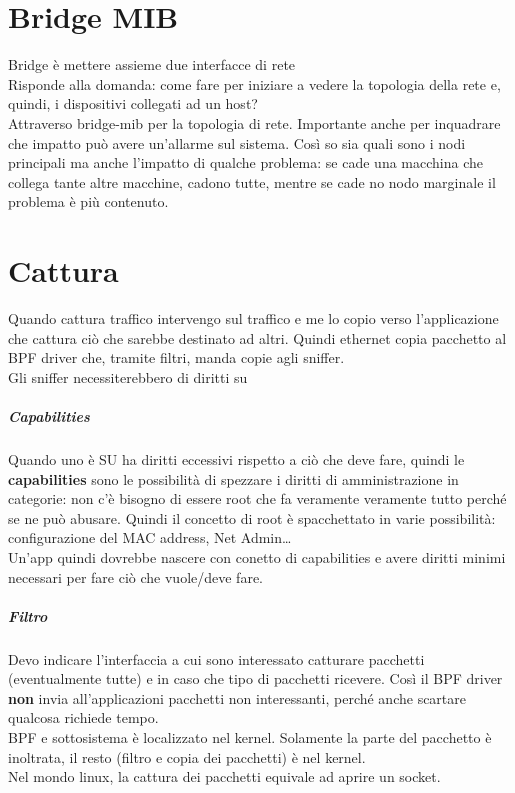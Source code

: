 \documentclass[10pt]{book}
\begin{document}
\chapter{Bridge MIB}
Bridge è mettere assieme due interfacce di rete\\
Risponde alla domanda: come fare per iniziare a vedere la topologia della rete e, quindi, i dispositivi collegati ad un host?\\
Attraverso bridge-mib per la topologia di rete. Importante anche per inquadrare che impatto può avere un'allarme sul sistema. Così so sia quali sono i nodi principali ma anche l'impatto di qualche problema: se cade una macchina che collega tante altre macchine, cadono tutte, mentre se cade no nodo marginale il problema è più contenuto.
\chapter{Cattura}
Quando cattura traffico intervengo sul traffico e me lo copio verso l'applicazione che cattura ciò che sarebbe destinato ad altri. Quindi ethernet copia pacchetto al BPF driver che, tramite filtri, manda copie agli sniffer.\\
Gli sniffer necessiterebbero di diritti su
\paragraph{Capabilities} Quando uno è SU ha diritti eccessivi rispetto a ciò che deve fare, quindi le \textbf{capabilities} sono le possibilità di spezzare i diritti di amministrazione in categorie: non c'è bisogno di essere root che fa veramente veramente tutto perché se ne può abusare. Quindi il concetto di root è spacchettato in varie possibilità: configurazione del MAC address, Net Admin\ldots\\
Un'app quindi dovrebbe nascere con conetto di capabilities e avere diritti minimi necessari per fare ciò che vuole/deve fare.
\paragraph{Filtro} Devo indicare l'interfaccia a cui sono interessato catturare pacchetti (eventualmente tutte) e in caso che tipo di pacchetti ricevere. Così il BPF driver \textbf{non} invia all'applicazioni pacchetti non interessanti, perché anche scartare qualcosa richiede tempo.\\
BPF e sottosistema è localizzato nel kernel. Solamente la parte del pacchetto è inoltrata, il resto (filtro e copia dei pacchetti) è nel kernel.\\
Nel mondo linux, la cattura dei pacchetti equivale ad aprire un socket.
\end{document}
